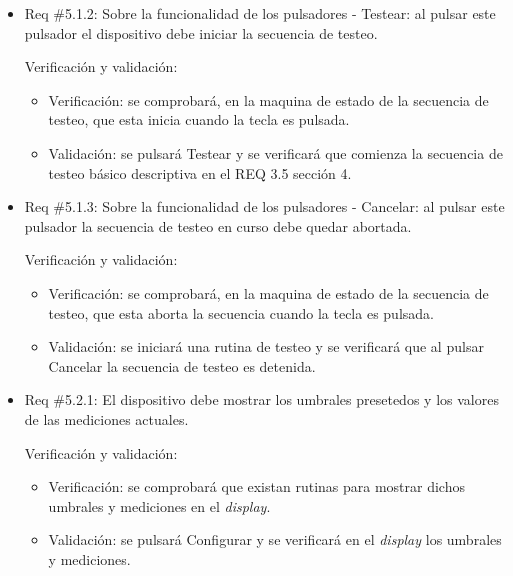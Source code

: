 \documentclass[11pt]{charter}
\begin{document}
\begin{itemize} 
\item Req \#5.1.2: Sobre la funcionalidad de los pulsadores - Testear: al pulsar este pulsador el dispositivo debe iniciar la secuencia de testeo.

Verificación y validación:

\begin{itemize}
\item Verificación: se comprobará, en la maquina de estado de la secuencia de testeo, que esta inicia cuando la tecla es pulsada.
\item Validación: se pulsará Testear y se verificará que comienza la secuencia de testeo básico descriptiva en el REQ 3.5 sección 4.
\end{itemize}

\end{itemize}

\begin{itemize} 
\item Req \#5.1.3: Sobre la funcionalidad de los pulsadores - Cancelar: al pulsar este pulsador la secuencia de testeo en curso debe quedar abortada.

Verificación y validación:

\begin{itemize}
\item Verificación: se comprobará, en la maquina de estado de la secuencia de testeo, que esta aborta la secuencia cuando la tecla es pulsada.
\item Validación: se iniciará una rutina de testeo y se verificará que al pulsar Cancelar la secuencia de testeo es detenida. 
\end{itemize}

\end{itemize}

\begin{itemize} 
\item Req \#5.2.1: El dispositivo debe mostrar los umbrales presetedos y los valores de las mediciones actuales.

Verificación y validación:

\begin{itemize}
\item Verificación: se comprobará que existan rutinas para mostrar dichos umbrales y mediciones en el \textit{display}.
\item Validación: se pulsará Configurar y se verificará en el \textit{display} los umbrales y mediciones.
\end{itemize}

\end{itemize}
\end{document}

